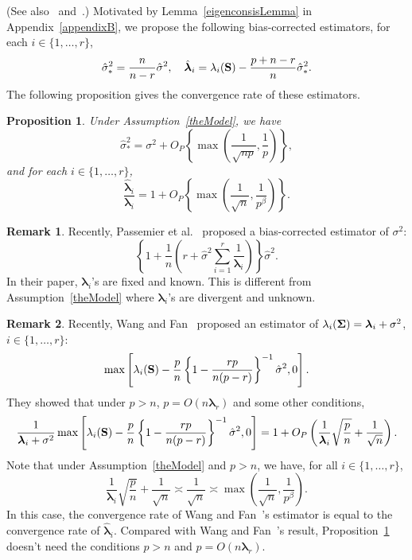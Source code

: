 \documentclass[times,sort&compress,3p]{elsarticle}
\newcommand{\bfsym}[1]{\ensuremath{\boldsymbol{#1}}}
\def\blambda {\bfsym {\lambda}}        \def\bLambda {\bfsym {\Lambda}}
\theoremstyle{plain}
\newtheorem{proposition}{\quad\quad Proposition}
\theoremstyle{definition}
\newtheorem{remark}{\quad\quad Remark}
\theoremstyle{remark}
\begin{document}
(See also~\cite{Fan2015Asymptotics} and~\cite{Passemier2015}.)
Motivated by Lemma~\ref{eigenconsisLemma} in Appendix~\ref{appendixB}, we propose the following bias-corrected estimators, for each $i\in\{1,\ldots, r\}$,
$$
\hat{\sigma}_*^2= \frac{n}{n-r} \hat{\sigma}^2,
\quad
\hat{\blambda}_i=\lambda_i(\BS)-\frac{p+n-r}{n}\hat{\sigma}_*^2.
$$
The following proposition gives the convergence rate of these estimators.
\begin{proposition}\label{varianceEstimation}
    Under Assumption~\ref{theModel}, we have 
    \begin{equation}\label{varianceEstimationPropResult1}
        \hat{\sigma}_*^2=\sigma^2 + O_P\left\{\max \left(\frac{1}{\sqrt{np}},\frac{1}{p}\right)\right\},
    \end{equation}
    and for each $i\in\{1,\ldots, r\}$,
    \begin{equation}\label{varianceEstimationPropResult2}
        \frac{\hat{\blambda}_i}{\blambda_i}
        =
        1+
        O_P\left\{\max\left(\frac{1}{\sqrt{n}},\frac{1}{p^{\beta}}\right)\right\}.
    \end{equation}
\end{proposition}
\begin{remark}
    Recently, Passemier {\rm et al.}~\cite{Passemier2015} proposed a bias-corrected estimator of $\sigma^2$:
$$
\left\{1+\frac{1}{n}\left(r+\hat{\sigma}^2\sum_{i=1}^r \frac{1}{\blambda_i}\right)\right\}\hat{\sigma}^2.
$$
In their paper, $\blambda_i$'s are fixed and known.
    This is different from Assumption~\ref{theModel} where $\blambda_i$'s are divergent and unknown.
\end{remark}
\begin{remark}
    Recently, Wang and Fan~\cite{Fan2015Asymptotics} proposed an estimator of
    $\lambda_i(\bSigma)=\blambda_i+\sigma^2$, $i\in\{1,\ldots, r\}$:
    $$
    \max\left[\lambda_i(\mathbf{S})-\frac{p}{n}\left\{1-\frac{rp}{n(p-r)}\right\}^{-1}\hat{\sigma}^2,0\right].
    $$
    They showed that under $p>n$, $p=O(n\blambda_r)$ and some other conditions,
    $$
    \frac{1}{\blambda_i+\sigma^2}\max\left[\lambda_i(\BS)-\frac{p}{n}\left\{ 1-\frac{rp}{n(p-r)}\right\}^{-1}\hat{\sigma}^2,0\right]
    =1+O_P\left(\frac{1}{\blambda_i}\sqrt{\frac{p}{n}}+\frac{1}{\sqrt{n}}\right).
    $$
    Note that under Assumption~\ref{theModel} and $p>n$, we have, for all $i\in\{1,\ldots, r\}$,
    $$
\frac{1}{\blambda_i}\sqrt{\frac{p}{n}}+\frac{1}{\sqrt{n}}\asymp
\frac{1}{\sqrt{n}}
\asymp
        \max\left(\frac{1}{\sqrt{n}},\frac{1}{p^{\beta}}\right).
    $$
    In this case, the convergence rate of Wang and Fan~\cite{Fan2015Asymptotics}'s estimator is equal to the convergence rate of $\hat{\blambda}_i$.
    Compared with Wang and Fan~\cite{Fan2015Asymptotics}'s result, Proposition~\ref{varianceEstimation} doesn't need the conditions $p>n$ and $p=O(n\blambda_r)$.
\end{remark}
\end{document}
